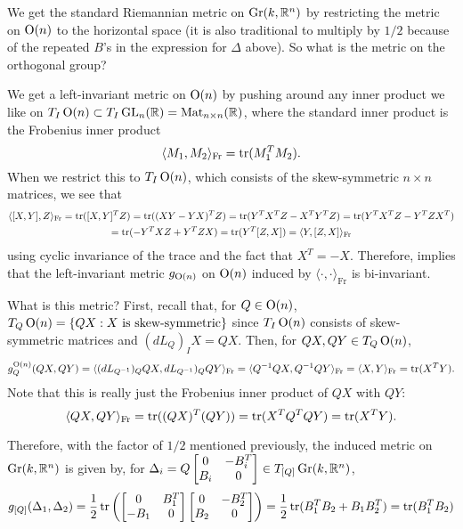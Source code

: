 We get the standard Riemannian metric on $\operatorname{Gr}(k,\mathbb{R}^n)$ by restricting the metric on $\operatorname{O}(n)$ to the horizontal space (it is also traditional to multiply by $1/2$ because of the repeated $B$'s in the expression for $\Delta$ above). So what is the metric on the orthogonal group?

We get a left-invariant metric on $\operatorname{O}(n)$ by pushing around any inner product we like on $T_I\operatorname{O}(n) \subset T_I \operatorname{GL}_n(\mathbb{R}) = \operatorname{Mat}_{n \times n}(\mathbb{R})$, where the standard inner product is the Frobenius inner product
\[
	\langle M_1, M_2 \rangle_{\text{Fr}} = \operatorname{tr}(M_1^T M_2).
\]
When we restrict this to $T_I\operatorname{O}(n)$, which consists of the skew-symmetric $n \times n$ matrices, we see that
\begin{multline*}
	\langle [X,Y],Z \rangle_{\text{Fr}} = \operatorname{tr}([X,Y]^TZ)= \operatorname{tr}((XY-YX)^TZ) = \operatorname{tr}(Y^TX^TZ-X^TY^TZ) = \operatorname{tr}(Y^TX^TZ - Y^TZX^T) \\
	= \operatorname{tr}(-Y^TXZ +Y^TZX) = \operatorname{tr}(Y^T[Z,X]) = \langle Y, [Z,X]\rangle_{\text{Fr}}
\end{multline*}
using cyclic invariance of the trace and the fact that $X^T = -X$. Therefore,  implies that the left-invariant metric $g_{\operatorname{O}(n)}$ on $\operatorname{O}(n)$ induced by $\langle \cdot , \cdot \rangle_{\text{Fr}}$ is bi-invariant.

What is this metric? First, recall that, for $Q \in \operatorname{O}(n)$, $T_Q \operatorname{O}(n) = \{Q X : X \text{ is skew-symmetric}\}$ since $T_I \operatorname{O}(n)$ consists of skew-symmetric matrices and $(dL_Q)_I X = QX$. Then, for $QX,QY \in T_Q \operatorname{O}(n)$,
\[
	g^{\operatorname{O}(n)}_Q(QX,QY) = \langle (dL_{Q^{-1}})_Q QX, dL_{Q^{-1}})_Q QY \rangle_{\text{Fr}} = \langle Q^{-1}QX, Q^{-1}QY \rangle_{\text{Fr}} = \langle X, Y \rangle_{\text{Fr}} = \operatorname{tr}(X^TY).
\]
Note that this is really just the Frobenius inner product of $QX$ with $QY$: 
\[
	\langle QX, QY \rangle_{\text{Fr}} = \operatorname{tr}((QX)^T(QY)) = \operatorname{tr}(X^T Q^T Q Y) = \operatorname{tr}(X^TY).
\]

Therefore, with the factor of $1/2$ mentioned previously, the induced metric on $\operatorname{Gr}(k, \mathbb{R}^n)$ is given by, for $\Delta_i = Q\begin{bmatrix} 0 & -B_i^T \\ B_i & 0 \end{bmatrix} \in T_{[Q]}\operatorname{Gr}(k,\mathbb{R}^n)$,
\[
	g_{[Q]}(\Delta_1,\Delta_2) = \frac{1}{2}\operatorname{tr}\left(\begin{bmatrix} 0 & B_1^T \\ -B_1 & 0 \end{bmatrix} \begin{bmatrix} 0 & -B_2^T \\ B_2 & 0 \end{bmatrix}\right) = \frac{1}{2} \operatorname{tr}(B_1^TB_2 + B_1B_2^T) = \operatorname{tr}(B_1^TB_2)
\]


